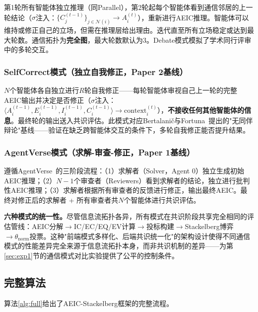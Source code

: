 \documentclass[12pt,a4paper,UTF8,fontset=fandol]{ctexart}
\begin{document}
第1轮所有智能体独立推理（同Parallel），第2轮起每个智能体看到通信邻居的上一轮结论（$\sigma$注入：$\{C_j^{(t-1)}\}_{j \in \mathcal{N}(i)} \to A_i^{(t)}$），重新进行AEIC推理。智能体可以维持或修正自己的立场，但需在推理层给出理由。迭代直至所有立场稳定或达到最大轮数。通信拓扑为\textbf{完全图}，最大轮数默认为3。Debate模式模拟了学术同行评审中的多轮交互。

\subsubsection{SelfCorrect模式（独立自我修正，Paper 2基线）}

$N$个智能体各自独立进行$R$轮自我修正——每轮智能体审视自己上一轮的完整AEIC输出并决定是否修正（$\sigma$注入：$\langle A_i^{(t-1)}, E_i^{(t-1)}, I_i^{(t-1)}, C_i^{(t-1)} \rangle \to \text{context}_i^{(t)}$），\textbf{不接收任何其他智能体的信息}。最终轮的输出送入共识评估。此模式对应Bertalani\v{c}与Fortuna~\cite{bertalanic2026cost}提出的"无同伴辩论"基线——验证在缺乏跨智能体交互的条件下，多轮自我修正能否提升结果。

\subsubsection{AgentVerse模式（求解-审查-修正，Paper 1基线）}

遵循AgentVerse~\cite{chen2023agentverse}的三阶段流程：（1）求解者（Solver，Agent 0）独立生成初始AEIC推理；（2）$N-1$个审查者（Reviewers）看到求解者的结论，独立进行批判性AEIC推理；（3）求解者根据所有审查者的反馈进行修正，输出最终AEIC。最终对修正后的求解者 + 所有审查者共$N$个智能体进行共识评估。

\textbf{六种模式的统一性。}尽管信息流拓扑各异，所有模式在共识阶段共享完全相同的评估管线：AEIC分解$\to$IC/EC/EQ/EV计算$\to$投标构建$\to$Stackelberg博弈$\to\theta_{\text{norm}}$投票。这种"前端模式多样化、后端共识统一化"的架构设计使得不同通信模式的性能差异完全来源于信息流拓扑本身，而非共识机制的差异——为第\ref{sec:exp1}节的通信模式对比实验提供了公平的控制条件。

\subsection{完整算法}\label{sec:algorithm}

算法\ref{alg:full}给出了AEIC-Stackelberg框架的完整流程。
\end{document}
